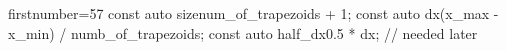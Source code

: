 \begin{cppcode*}{firstnumber=57}
    const auto size{num_of_trapezoids + 1};
    const auto dx{(x_max - x_min) / numb_of_trapezoids};
    const auto half_dx{0.5 * dx}; // needed later
\end{cppcode*}
